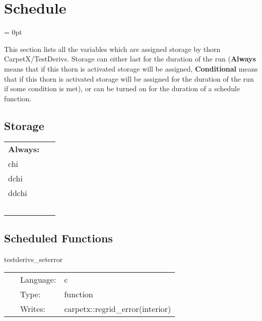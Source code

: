 
\section{Schedule} 


\parskip = 0pt


\noindent This section lists all the variables which are assigned storage by thorn CarpetX/TestDerivs.  Storage can either last for the duration of the run ({\bf Always} means that if this thorn is activated storage will be assigned, {\bf Conditional} means that if this thorn is activated storage will be assigned for the duration of the run if some condition is met), or can be turned on for the duration of a schedule function.


\subsection*{Storage}

\hspace{5mm}

 \begin{tabular*}{160mm}{ll} 

{\bf Always:}&  ~ \\ 
 chi & ~\\ 
 dchi & ~\\ 
 ddchi & ~\\ 
~ & ~\\ 
\end{tabular*} 


\subsection*{Scheduled Functions}
\vspace{5mm}


\hspace{5mm} testderivs\_seterror 

\hspace{5mm}{\it set up test grid } 


\hspace{5mm}

 \begin{tabular*}{160mm}{cll} 
~ & Language:  & c \\ 
~ & Type:  & function \\ 
~ & Writes:  & carpetx::regrid\_error(interior) \\ 
\end{tabular*} 


